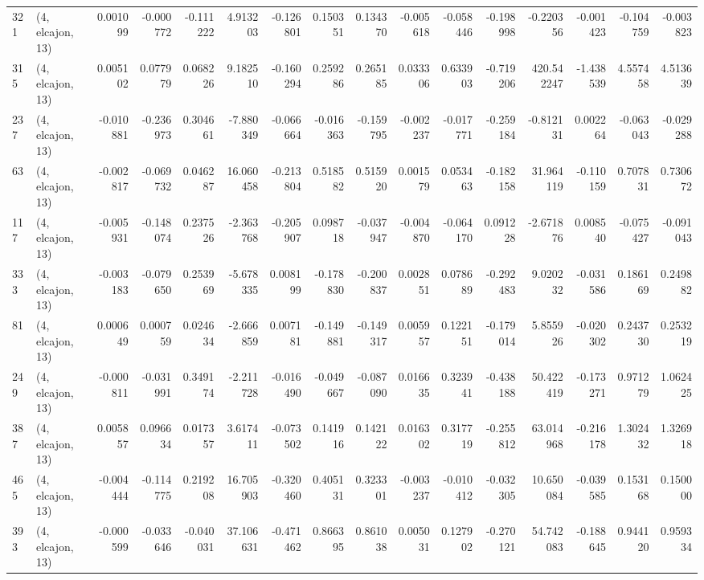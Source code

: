 \begin{tabular}{llrrrrrrrrrrrrrr}
321 &  (4, elcajon, 13) &   0.001099 & -0.000772 & -0.111222 &    4.913203 & -0.126801 &   0.150351 &  0.134370 & -0.005618 & -0.058446 & -0.198998 &   -0.220356 & -0.001423 & -0.104759 & -0.003823 \\
315 &  (4, elcajon, 13) &   0.005102 &  0.077979 &  0.068226 &    9.182510 & -0.160294 &   0.259286 &  0.265185 &  0.033306 &  0.633903 & -0.719206 &  420.542247 & -1.438539 &  4.557458 &  4.513639 \\
237 &  (4, elcajon, 13) &  -0.010881 & -0.236973 &  0.304661 &   -7.880349 & -0.066664 &  -0.016363 & -0.159795 & -0.002237 & -0.017771 & -0.259184 &   -0.812131 &  0.002264 & -0.063043 & -0.029288 \\
63  &  (4, elcajon, 13) &  -0.002817 & -0.069732 &  0.046287 &   16.060458 & -0.213804 &   0.518582 &  0.515920 &  0.001579 &  0.053463 & -0.182158 &   31.964119 & -0.110159 &  0.707831 &  0.730672 \\
117 &  (4, elcajon, 13) &  -0.005931 & -0.148074 &  0.237526 &   -2.363768 & -0.205907 &   0.098718 & -0.037947 & -0.004870 & -0.064170 &  0.091228 &   -2.671876 &  0.008540 & -0.075427 & -0.091043 \\
333 &  (4, elcajon, 13) &  -0.003183 & -0.079650 &  0.253969 &   -5.678335 &  0.008199 &  -0.178830 & -0.200837 &  0.002851 &  0.078689 & -0.292483 &    9.020232 & -0.031586 &  0.186169 &  0.249882 \\
81  &  (4, elcajon, 13) &   0.000649 &  0.000759 &  0.024634 &   -2.666859 &  0.007181 &  -0.149881 & -0.149317 &  0.005957 &  0.122151 & -0.179014 &    5.855926 & -0.020302 &  0.243730 &  0.253219 \\
249 &  (4, elcajon, 13) &  -0.000811 & -0.031991 &  0.349174 &   -2.211728 & -0.016490 &  -0.049667 & -0.087090 &  0.016635 &  0.323941 & -0.438188 &   50.422419 & -0.173271 &  0.971279 &  1.062425 \\
387 &  (4, elcajon, 13) &   0.005857 &  0.096634 &  0.017357 &    3.617411 & -0.073502 &   0.141916 &  0.142122 &  0.016302 &  0.317719 & -0.255812 &   63.014968 & -0.216178 &  1.302432 &  1.326918 \\
465 &  (4, elcajon, 13) &  -0.004444 & -0.114775 &  0.219208 &   16.705903 & -0.320460 &   0.405131 &  0.323301 & -0.003237 & -0.010412 & -0.032305 &   10.650084 & -0.039585 &  0.153168 &  0.150000 \\
393 &  (4, elcajon, 13) &  -0.000599 & -0.033646 & -0.040031 &   37.106631 & -0.471462 &   0.866395 &  0.861038 &  0.005031 &  0.127902 & -0.270121 &   54.742083 & -0.188645 &  0.944120 &  0.959334 \\

\end{tabular}
